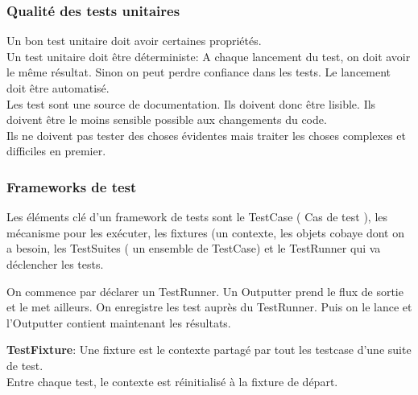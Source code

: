 \subsubsection{Qualité des tests unitaires}
	Un bon test unitaire doit avoir certaines propriétés.
	\\Un test unitaire doit être déterministe: A chaque lancement du test, on doit avoir le même résultat. Sinon on peut perdre confiance dans les tests. Le lancement doit être automatisé.
	\\Les test sont une source de documentation. 
	Ils doivent donc être lisible. Ils doivent être le moins sensible possible aux changements du code.
	\\Ils ne doivent pas tester des choses évidentes mais traiter les choses complexes et difficiles en premier.


\subsubsection{Frameworks de test}
	Les éléments clé d’un framework de tests sont le TestCase ( Cas de test ), les mécanisme pour les exécuter, les fixtures (un contexte, les objets cobaye dont on a besoin, les TestSuites ( un ensemble de TestCase) et le TestRunner qui va déclencher les tests.

	On commence par déclarer un TestRunner. Un Outputter prend le flux de sortie et le met ailleurs. On enregistre les test auprès du TestRunner. Puis on le lance et l’Outputter contient maintenant les résultats.

	\textbf{TestFixture}: Une fixture est le contexte partagé par tout les testcase d’une suite de test.
	\\Entre chaque test, le contexte est réinitialisé à la fixture de départ.